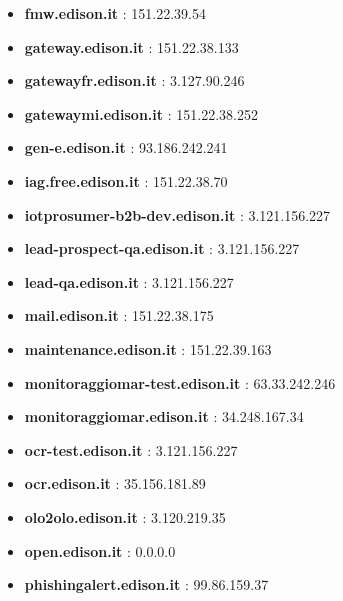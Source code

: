 \documentclass{article}
\begin{document}
\begin{itemize}
            \item \textbf{ fmw.edison.it }: 151.22.39.54
        
            \item \textbf{ gateway.edison.it }: 151.22.38.133
        
            \item \textbf{ gatewayfr.edison.it }: 3.127.90.246
        
            \item \textbf{ gatewaymi.edison.it }: 151.22.38.252
        
            \item \textbf{ gen-e.edison.it }: 93.186.242.241
        
            \item \textbf{ iag.free.edison.it }: 151.22.38.70
        
            \item \textbf{ iotprosumer-b2b-dev.edison.it }: 3.121.156.227
        
            \item \textbf{ lead-prospect-qa.edison.it }: 3.121.156.227
        
            \item \textbf{ lead-qa.edison.it }: 3.121.156.227
        
            \item \textbf{ mail.edison.it }: 151.22.38.175
        
            \item \textbf{ maintenance.edison.it }: 151.22.39.163
        
            \item \textbf{ monitoraggiomar-test.edison.it }: 63.33.242.246
        
            \item \textbf{ monitoraggiomar.edison.it }: 34.248.167.34
        
            \item \textbf{ ocr-test.edison.it }: 3.121.156.227
        
            \item \textbf{ ocr.edison.it }: 35.156.181.89
        
            \item \textbf{ olo2olo.edison.it }: 3.120.219.35
        
            \item \textbf{ open.edison.it }: 0.0.0.0
        
            \item \textbf{ phishingalert.edison.it }: 99.86.159.37
        

\end{itemize}
\end{document}
